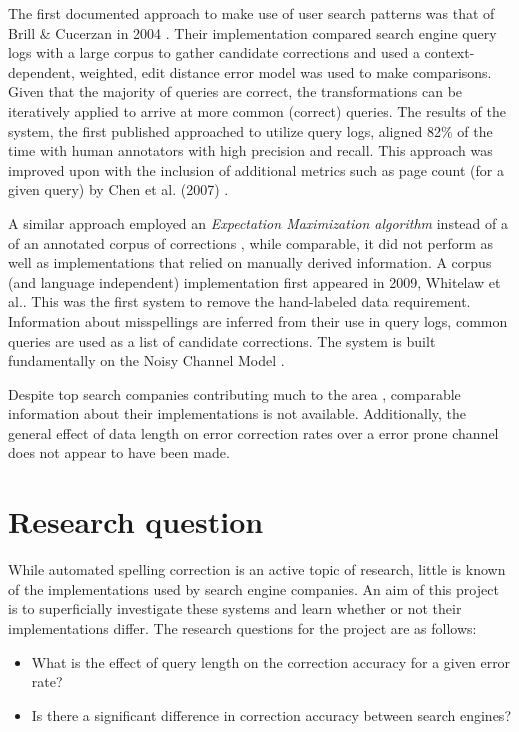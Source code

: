 \documentclass{csfourzero}
\begin{document}
The first documented approach to make use of user search patterns was that of Brill \& Cucerzan in 2004 \cite{webuserpoweredspelling}. Their implementation compared search engine query logs with a large corpus to gather candidate corrections and used a context-dependent, weighted, edit distance error model was used to make comparisons. Given that the majority of queries are correct, the transformations can be iteratively applied to arrive at more common (correct) queries. The results of the system, the first published approached to utilize query logs, aligned 82\% of the time with human annotators with high precision and recall. This approach was improved upon with the inclusion of additional metrics such as page count (for a given query) by Chen et al. (2007) \cite{webuser3}.

A similar approach employed an \textit{Expectation Maximization algorithm} instead of a of an annotated corpus of corrections \cite{webuser2learningerrormodel}, while comparable, it did not perform as well as implementations that relied on manually derived information. A corpus (and language independent) implementation first appeared in 2009, Whitelaw et al.\cite{webuser4google2009}. This was the first system to remove the hand-labeled data requirement. Information about misspellings are inferred from their use in query logs, common queries are used as a list of candidate corrections. The system is built fundamentally on the Noisy Channel Model \cite{claudeshannon1948}.

Despite top search companies contributing much to the area \cite{microranker, webuser3, webuserpoweredspelling, microranker, microphone, webuser4google2009}, comparable information about their implementations is not available. Additionally, the general effect of data length on error correction rates over a error prone channel does not appear to have been made.

\section{Research question}
\label{sec:rq}

While automated spelling correction is an active topic of research, little is known of the implementations used by search engine companies. An aim of this project is to superficially investigate these systems and learn whether or not their implementations differ. The research questions for the project are as follows:

\begin{itemize}
  \item{What is the effect of query length on the correction accuracy for a given error rate?}
  \item{Is there a significant difference in correction accuracy between search engines?}
\end{itemize}
\end{document}

